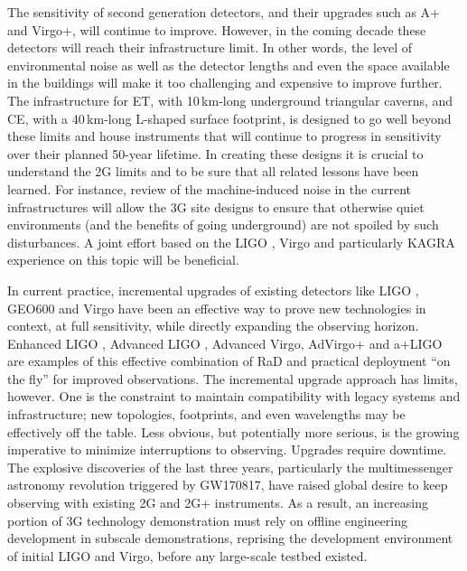The sensitivity of second generation detectors, and their upgrades such as A+ and Virgo+, will continue to improve. 
However, in the coming decade these detectors will reach their infrastructure limit. In other words, the level of environmental noise as well as the detector lengths and even the space available in the buildings will make it too challenging and expensive to improve further. The infrastructure for ET, with 10\,km-long underground triangular caverns, and CE, with a 40\,km-long L-shaped surface footprint, is designed to go well beyond these limits and house instruments that will continue to progress in sensitivity over their planned 50-year lifetime.   
In creating these designs it is crucial to understand the 2G limits and to be sure that all related lessons have been learned. For instance, review of the machine-induced noise in the current infrastructures will allow the \ac{3G} site designs to ensure that otherwise quiet environments (and the benefits of going underground) are not spoiled by such disturbances. A joint effort based on the \ac{LIGO} , Virgo and particularly \ac{KAGRA}  experience on this topic will be beneficial. 

In current practice, incremental upgrades of existing detectors like \ac{LIGO} , GEO600  and \ac{Virgo}  have been an effective way to prove new technologies in context, at full sensitivity, while directly expanding the observing horizon. Enhanced \ac{LIGO} , Advanced \ac{LIGO} , Advanced Virgo, \ac{AdVirgo+}  and \ac{a+LIGO}  are examples of this effective combination of \ac{RaD}  and practical deployment ``on the fly''  for improved observations.  
The incremental upgrade approach has limits, however.  One is the constraint to maintain compatibility with legacy systems and infrastructure; new topologies, footprints, and even wavelengths may be effectively off the table. Less obvious, but potentially more serious, is the growing imperative to minimize interruptions to observing. Upgrades require downtime.  The explosive discoveries of the last three years, particularly the multimessenger astronomy revolution triggered by GW170817,  have raised global desire to keep observing with existing 2G and 2G+ instruments. 
As a result, an increasing portion of \ac{3G} technology demonstration must rely on offline engineering development in subscale demonstrations, reprising the development environment of initial \ac{LIGO}  and Virgo, before any large-scale testbed existed. 

